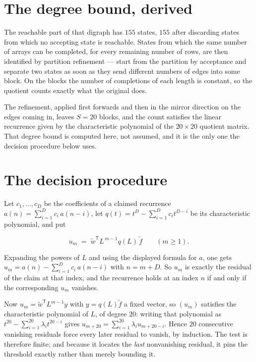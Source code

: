 \documentclass[11pt]{article}
\theoremstyle{definition}
\begin{document}
\section{The degree bound, derived}

The reachable part of that digraph has $155$ states, $155$ after discarding states from which no accepting state is reachable. States from which the same number of arrays can be completed, for every remaining number of rows, are then identified by partition refinement --- start from the partition by acceptance and separate two states as soon as they send different numbers of edges into some block. On the blocks the number of completions of each length is constant, so the quotient counts exactly what the original does.

The refinement, applied first forwards and then in the mirror direction on the edges coming in, leaves $S = 20$ blocks, and the count satisfies the linear recurrence given by the characteristic polynomial of the $20 \times 20$ quotient matrix. That degree bound is computed here, not assumed, and it is the only one the decision procedure below uses.

\section{The decision procedure}

Let $c_1,\dots,c_D$ be the coefficients of a claimed recurrence $a(n) = \sum_{i=1}^{D} c_i\,a(n-i)$, let $q(t) = t^{D} - \sum_{i=1}^{D} c_i t^{D-i}$ be its characteristic polynomial, and put

\[u_m \;=\; \tilde w^{\mathsf T} L^{\,m-1} q(L)\,\tilde f \qquad (m \ge 1).\]

Expanding the powers of $L$ and using the displayed formula for $a$, one gets $u_m = a(n) - \sum_{i=1}^{D} c_i\,a(n-i)$ with $n = m + D$. So $u_m$ is exactly the residual of the claim at that index, and the recurrence holds at an index $n$ if and only if the corresponding $u_m$ vanishes.

Now $u_m = \tilde w^{\mathsf T} L^{m-1} y$ with $y = q(L)\tilde f$ a fixed vector, so $(u_m)$ satisfies the characteristic polynomial of $L$, of degree $20$: writing that polynomial as $t^{20} - \sum_{i=1}^{20} \lambda_i t^{20-i}$ gives $u_{m+20} = \sum_{i=1}^{20} \lambda_i u_{m+20-i}$. Hence $20$ consecutive vanishing residuals force every later residual to vanish, by induction. The test is therefore finite; and because it locates the {\itshape last} nonvanishing residual, it pins the threshold exactly rather than merely bounding it.
\end{document}
